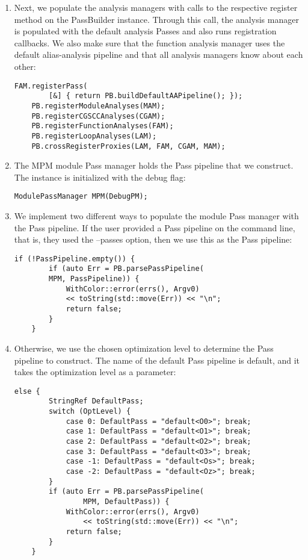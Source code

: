 \begin{enumerate}
\item Next, we populate the analysis managers with calls to the respective register method on the PassBuilder instance. Through this call, the analysis manager is populated with the default analysis Passes and also runs registration callbacks. We also make sure that the function analysis manager uses the default alias-analysis pipeline and that all analysis managers know about each other:
\begin{lstlisting}[caption={}]
	FAM.registerPass(
		[&] { return PB.buildDefaultAAPipeline(); });
	PB.registerModuleAnalyses(MAM);
	PB.registerCGSCCAnalyses(CGAM);
	PB.registerFunctionAnalyses(FAM);
	PB.registerLoopAnalyses(LAM);
	PB.crossRegisterProxies(LAM, FAM, CGAM, MAM);
\end{lstlisting}

\item The MPM module Pass manager holds the Pass pipeline that we construct. The instance is initialized with the debug flag:
\begin{lstlisting}[caption={}]
	ModulePassManager MPM(DebugPM);
\end{lstlisting}

\item We implement two different ways to populate the module Pass manager with the Pass pipeline. If the user provided a Pass pipeline on the command line, that is, they used the --passes option, then we use this as the Pass pipeline:
\begin{lstlisting}[caption={}]
	if (!PassPipeline.empty()) {
		if (auto Err = PB.parsePassPipeline(
		MPM, PassPipeline)) {
			WithColor::error(errs(), Argv0)
			<< toString(std::move(Err)) << "\n";
			return false;
		}
	}
\end{lstlisting}

\item Otherwise, we use the chosen optimization level to determine the Pass pipeline to construct. The name of the default Pass pipeline is default, and it takes the optimization level as a parameter:
\begin{lstlisting}[caption={}]
	else {
		StringRef DefaultPass;
		switch (OptLevel) {
			case 0: DefaultPass = "default<O0>"; break;
			case 1: DefaultPass = "default<O1>"; break;
			case 2: DefaultPass = "default<O2>"; break;
			case 3: DefaultPass = "default<O3>"; break;
			case -1: DefaultPass = "default<Os>"; break;
			case -2: DefaultPass = "default<Oz>"; break;
		}
		if (auto Err = PB.parsePassPipeline(
				MPM, DefaultPass)) {
			WithColor::error(errs(), Argv0)
				<< toString(std::move(Err)) << "\n";
			return false;
		}
	}
\end{lstlisting}


\end{enumerate}
